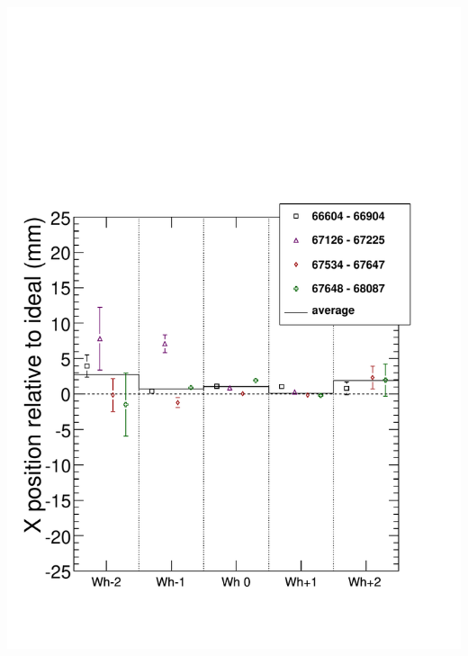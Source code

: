 \documentclass[compress]{beamer}
\begin{document}
\begin{frame}
{\begin{columns}
\includegraphics[width=\linewidth]{bydataset_MP_x.pdf}

\end{columns}}
\end{frame}
\end{document}
